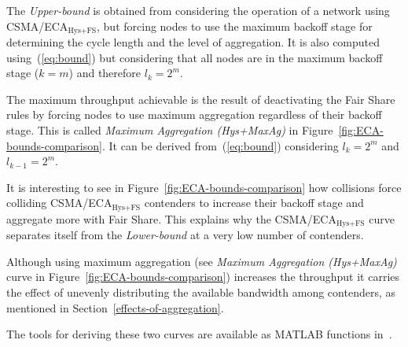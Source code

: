 \documentclass[a4paper,journal]{IEEEtran}
\begin{document}
	The \emph{Upper-bound} is obtained from considering the operation of a network using CSMA/ECA$_{\text{Hys+FS}}$, but forcing nodes to use the maximum backoff stage for determining the cycle length and the level of aggregation. It is also computed using~(\ref{eq:bound}) but considering that all nodes are in the maximum backoff stage ($k=m$) and therefore $l_{k}=2^{m}$.

	The maximum throughput achievable is the result of deactivating the Fair Share rules by forcing nodes to use maximum aggregation regardless of their backoff stage. This is called \emph{Maximum Aggregation (Hys+MaxAg)} in Figure~\ref{fig:ECA-bounds-comparison}. It can be derived from~(\ref{eq:bound}) considering $l_{k} = 2^{m}$ and $l_{k-1}=2^{m}$.

	It is interesting to see in Figure~\ref{fig:ECA-bounds-comparison} how collisions force colliding CSMA/ECA$_{\text{Hys+FS}}$ contenders to increase their backoff stage and aggregate more with Fair Share. This explains why the CSMA/ECA$_{\text{Hys+FS}}$ curve separates itself from the \emph{Lower-bound} at a very low number of contenders. 

	Although using maximum aggregation (see \emph{Maximum Aggregation (Hys+MaxAg)} curve in Figure~\ref{fig:ECA-bounds-comparison}) increases the throughput it carries the effect of unevenly distributing the available bandwidth among contenders, as mentioned in Section~\ref{effects-of-aggregation}.

	The tools for deriving these two curves are available as MATLAB functions in~\cite{ECA-bounds-example}. 
\end{document}
